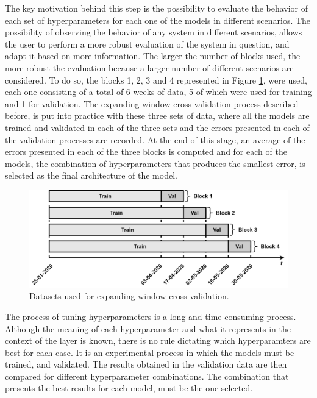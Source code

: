 The key motivation behind this step is the possibility to evaluate the behavior of each set of hyperparameters for each one of the models in different scenarios. The possibility of observing the behavior of any system in different scenarios, allows the user to perform a more robust evaluation of the system in question, and adapt it based on more information. The larger the number of blocks used, the more robust the evaluation because a larger number of different scenarios are considered. To do so, the blocks 1, 2, 3 and 4 represented in Figure \ref{hyptun}, were used, each one consisting of a total of 6 weeks of data, 5 of which were used for training and 1 for validation. The expanding window cross-validation process described before, is put into practice with these three sets of data, where all the models are trained and validated in each of the three sets and the errors presented in each of the validation processes are recorded. At the end of this stage, an average of the errors presented in each of the three blocks is computed and for each of the models, the combination of hyperparameters that produces the smallest error, is selected as the final architecture of the model. 

\begin{figure}[h!]
    \centering
    \begin{center}
    \includegraphics[width=1\textwidth]{Images/hyptun.png}
    \caption{Datasets used for expanding window cross-validation.}
    \label{hyptun}
    \end{center}
\end{figure}

The process of tuning hyperparameters is a long and time consuming process. Although the meaning of each hyperparameter and what it represents in the context of the layer is known, there is no rule dictating which hyperparamters are best for each case. It is an experimental process in which the models must be trained, and validated. The results obtained in the validation data are then compared for different hyperparameter combinations. The combination that presents the best results for each model, must be the one selected. 


